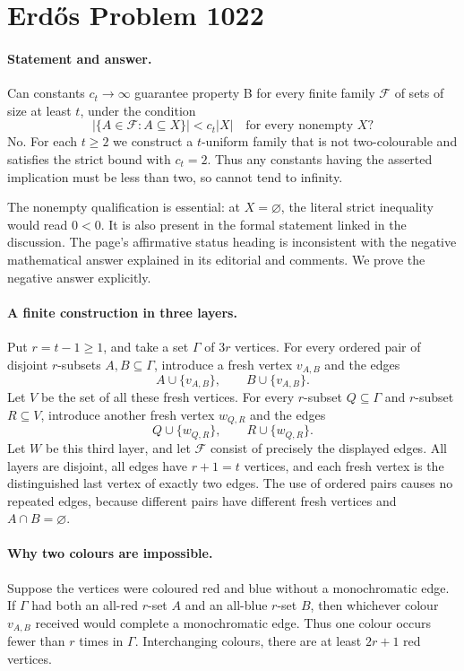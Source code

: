 \section*{Erd\H{o}s Problem 1022}

\paragraph{Statement and answer.}
Can constants \(c_t\to\infty\) guarantee property B for every finite family \(\mathcal F\) of sets of size at least \(t\), under the condition
\[
 |\{A\in\mathcal F:A\subseteq X\}|<c_t|X|
 \quad\text{for every nonempty }X?
\]
No. For each \(t\geq2\) we construct a \(t\)-uniform family that is not two-colourable and satisfies the strict bound with \(c_t=2\). Thus any constants having the asserted implication must be less than two, so cannot tend to infinity.

The nonempty qualification is essential: at \(X=\varnothing\), the literal strict inequality would read \(0<0\). It is also present in the formal statement linked in the discussion. The page's affirmative status heading is inconsistent with the negative mathematical answer explained in its editorial and comments. We prove the negative answer explicitly.

\paragraph{A finite construction in three layers.}
Put \(r=t-1\geq1\), and take a set \(\Gamma\) of \(3r\) vertices. For every ordered pair of disjoint \(r\)-subsets \(A,B\subseteq\Gamma\), introduce a fresh vertex \(v_{A,B}\) and the edges
\[
 A\cup\{v_{A,B}\},\qquad B\cup\{v_{A,B}\}.
\]
Let \(V\) be the set of all these fresh vertices. For every \(r\)-subset \(Q\subseteq\Gamma\) and \(r\)-subset \(R\subseteq V\), introduce another fresh vertex \(w_{Q,R}\) and the edges
\[
 Q\cup\{w_{Q,R}\},\qquad R\cup\{w_{Q,R}\}.
\]
Let \(W\) be this third layer, and let \(\mathcal F\) consist of precisely the displayed edges. All layers are disjoint, all edges have \(r+1=t\) vertices, and each fresh vertex is the distinguished last vertex of exactly two edges. The use of ordered pairs causes no repeated edges, because different pairs have different fresh vertices and \(A\cap B=\varnothing\).

\paragraph{Why two colours are impossible.}
Suppose the vertices were coloured red and blue without a monochromatic edge. If \(\Gamma\) had both an all-red \(r\)-set \(A\) and an all-blue \(r\)-set \(B\), then whichever colour \(v_{A,B}\) received would complete a monochromatic edge. Thus one colour occurs fewer than \(r\) times in \(\Gamma\). Interchanging colours, there are at least \(2r+1\) red vertices.


